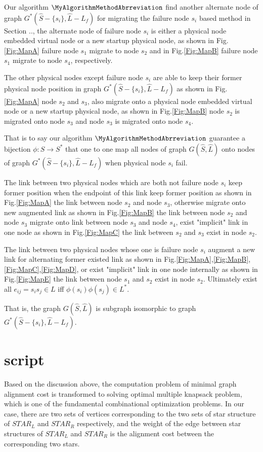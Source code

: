 Our algorithm $\MyAlgorithmMethodAbrreviation$ find another alternate node of graph $G^*\left( {\hat S  - \{ {s_i}\} ,\hat L  - {L_f}} \right)$ for migrating the failure node $s_i$ based method in Section .., the alternate node of failure node $s_i$ is either a physical node embedded virtual node or a new startup physical node, as shown in Fig.\ref{Fig:MapA} failure node $s_1$ migrate to node $s_2$ and in Fig.\ref{Fig:MapB} failure node $s_1$ migrate to node $s_4$, respectively.

The other physical nodes except failure node $s_i$ are able to keep their  former physical node position in graph $G^*\left( {\hat S  - \{ {s_i}\} ,\hat L  - {L_f}} \right)$ as shown in Fig.\ref{Fig:MapA} node $s_2$ and $s_3$, also migrate onto a physical node embedded virtual node or a new startup physical node, as shown in Fig.\ref{Fig:MapB} node $s_2$ is migrated onto node $s_3$ and node $s_3$ is migrated onto node $s_4$.

That is to say our algorithm $\MyAlgorithmMethodAbrreviation$ guarantee  a bijection $\phi:S\rightarrow S^*$ that one to one map all nodes of graph $G({\hat S,\hat L})$ onto nodes of graph $G^*\left( {\hat S  - \{ {s_i}\} ,\hat L  - {L_f}} \right)$ when physical node $s_i$ fail.

The link between two physical nodes which are both not failure node $s_i$ keep former position when the endpoint of this link keep former  position  as shown in Fig.\ref{Fig:MapA} the link between node $s_2$ and node $s_3$, otherwise migrate onto new augmented link as shown in Fig.\ref{Fig:MapB} the link between node $s_2$ and node $s_3$ migrate onto link between node $s_3$ and node $s_4$, exist "implicit" link in one node as shown in Fig.\ref{Fig:MapC} the link between $s_2$ and $s_3$ exist in node $s_2$.

The link between two physical nodes whose one is failure node $s_i$ augment a new link for alternating former existed link as shown in Fig.\ref{Fig:MapA},\ref{Fig:MapB},\ref{Fig:MapC},\ref{Fig:MapD}, or exist "implicit" link in one node internally as shown in Fig.\ref{Fig:MapE} the link between node $s_1$ and $s_2$ exist in node $s_2$. Ultimately exist all $e_{ij}=s_is_j\in L$ iff $\phi(s_i)\phi(s_j)\in L^*$.

That is, the graph $G({\hat S,\hat L})$ is subgraph isomorphic to graph $G^*\left( {\hat S  - \{ {s_i}\} ,\hat L  - {L_f}} \right)$.




\section{script}
Based on the discussion above, the computation problem of minimal graph alignment cost is transformed to solving optimal multiple knapsack problem, which is one of the fundamental combinational optimization problems. In our case, there are two sets of vertices corresponding to the two sets of star structure of $STAR_L$ and $STAR_R$ respectively, and the weight of the edge between star structures of $STAR_L$ and $STAR_R$ is the alignment cost between the corresponding two stars.

